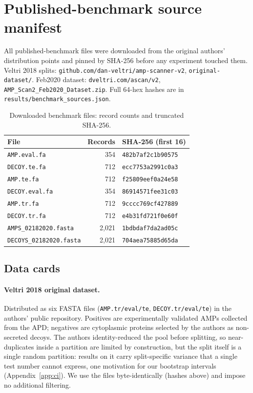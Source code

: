 
\section{Published-benchmark source manifest}\label{app:sources}
All published-benchmark files were downloaded from the original authors'
distribution points and pinned by SHA-256 before any experiment touched
them. Veltri 2018 splits: \texttt{github.com/dan-veltri/amp-scanner-v2},
\texttt{original-dataset/}. Feb2020 dataset:
\texttt{dveltri.com/ascan/v2}, \texttt{AMP\_Scan2\_Feb2020\_Dataset.zip}.
Full 64-hex hashes are in \texttt{results/benchmark\_sources.json}.

\begin{table}[h]\centering\small
\caption{Downloaded benchmark files: record counts and truncated SHA-256.}
\label{tab:manifest}
\begin{tabular}{lrl}
\hline
File & Records & SHA-256 (first 16) \\
\hline
\texttt{AMP.eval.fa} & 354 & \texttt{482b7af2c1b90575} \\
\texttt{DECOY.te.fa} & 712 & \texttt{ecc7753a2991c0a3} \\
\texttt{AMP.te.fa} & 712 & \texttt{f25809eef0a24e58} \\
\texttt{DECOY.eval.fa} & 354 & \texttt{86914571fee31c03} \\
\texttt{AMP.tr.fa} & 712 & \texttt{9cccc769cf427889} \\
\texttt{DECOY.tr.fa} & 712 & \texttt{e4b31fd721f0e60f} \\
\texttt{AMPS\_02182020.fasta} & 2,021 & \texttt{1bdbdaf7da2ad05c} \\
\texttt{DECOYS\_02182020.fasta} & 2,021 & \texttt{704aea75885d65da} \\
\hline
\end{tabular}
\end{table}

\subsection*{Data cards}
\paragraph{Veltri 2018 original dataset.} Distributed as six FASTA files
(\texttt{AMP.tr/eval/te}, \texttt{DECOY.tr/eval/te}) in the authors'
public repository. Positives are experimentally validated AMPs collected
from the APD; negatives are cytoplasmic proteins selected by the authors
as non-secreted decoys. The authors identity-reduced the pool before
splitting, so near-duplicates inside a partition are limited by
construction, but the split itself is a single random partition: results
on it carry split-specific variance that a single test number cannot
express, one motivation for our bootstrap intervals
(Appendix~\ref{app:ci}). We use the files byte-identically (hashes above)
and impose no additional filtering.

